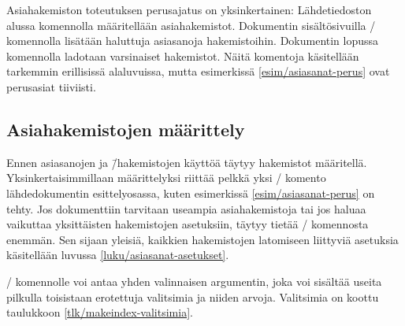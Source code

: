 Asiahakemiston toteutuksen perusajatus on yksinkertainen: Lähdetiedoston
alussa komennolla  määritellään asiahakemistot.
Dokumentin sisältösivuilla \-/ komennolla lisätään
haluttuja asiasanoja hakemistoihin. Dokumentin lopussa komennolla
 ladotaan varsinaiset hakemistot. Näitä komentoja
käsitellään tarkemmin erillisissä alaluvuissa, mutta esimerkissä
\ref{esim/asiasanat-perus} ovat perusasiat tiiviisti.

\subsection{Asiahakemistojen määrittely}
\label{luku/asiasanat-määrittely}

Ennen asiasanojen ja \=/hakemistojen käyttöä täytyy hakemistot
määritellä. Yksinkertaisimmillaan määrittelyksi riittää pelkkä yksi
\-/ komento lähdedokumentin esittelyosassa, kuten
esimerkissä \ref{esim/asiasanat-perus} on tehty. Jos dokumenttiin
tarvitaan useampia asiahakemistoja tai jos haluaa vaikuttaa yksittäisten
hakemistojen asetuksiin, täytyy tietää \-/ komennosta
enemmän. Sen sijaan yleisiä, kaikkien hakemistojen latomiseen liittyviä
asetuksia käsitellään luvussa \ref{luku/asiasanat-asetukset}.


\-/ komennolle voi antaa yhden valinnaisen
argumentin, joka voi sisältää useita pilkulla toisistaan erotettuja
valitsimia ja niiden arvoja. Valitsimia on koottu taulukkoon
\ref{tlk/makeindex-valitsimia}.

